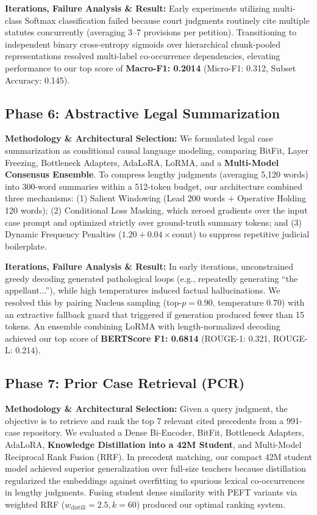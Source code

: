\documentclass[11pt, oneside]{article}
\begin{document}
\medskip
\noindent
\textbf{Iterations, Failure Analysis \& Result:} Early experiments utilizing multi-class Softmax classification failed because court judgments routinely cite multiple statutes concurrently (averaging 3--7 provisions per petition). Transitioning to independent binary cross-entropy sigmoids over hierarchical chunk-pooled representations resolved multi-label co-occurrence dependencies, elevating performance to our top score of \textbf{Macro-F1: 0.2014} (Micro-F1: 0.312, Subset Accuracy: 0.145).

\subsection{Phase 6: Abstractive Legal Summarization}
\noindent
\textbf{Methodology \& Architectural Selection:} We formulated legal case summarization as conditional causal language modeling, comparing BitFit, Layer Freezing, Bottleneck Adapters, AdaLoRA, LoRMA, and a \textbf{Multi-Model Consensus Ensemble}. To compress lengthy judgments (averaging 5,120 words) into 300-word summaries within a 512-token budget, our architecture combined three mechanisms: (1) Salient Windowing (Lead 200 words + Operative Holding 120 words); (2) Conditional Loss Masking, which zeroed gradients over the input case prompt and optimized strictly over ground-truth summary tokens; and (3) Dynamic Frequency Penalties ($1.20 + 0.04 \times \text{count}$) to suppress repetitive judicial boilerplate.

\medskip
\noindent
\textbf{Iterations, Failure Analysis \& Result:} In early iterations, unconstrained greedy decoding generated pathological loops (e.g., repeatedly generating ``the appellant...''), while high temperatures induced factual hallucinations. We resolved this by pairing Nucleus sampling (top-$p=0.90$, temperature $0.70$) with an extractive fallback guard that triggered if generation produced fewer than 15 tokens. An ensemble combining LoRMA with length-normalized decoding achieved our top score of \textbf{BERTScore F1: 0.6814} (ROUGE-1: 0.321, ROUGE-L: 0.214).

\subsection{Phase 7: Prior Case Retrieval (PCR)}
\noindent
\textbf{Methodology \& Architectural Selection:} Given a query judgment, the objective is to retrieve and rank the top 7 relevant cited precedents from a 991-case repository. We evaluated a Dense Bi-Encoder, BitFit, Bottleneck Adapters, AdaLoRA, \textbf{Knowledge Distillation into a 42M Student}, and Multi-Model Reciprocal Rank Fusion (RRF). In precedent matching, our compact 42M student model achieved superior generalization over full-size teachers because distillation regularized the embeddings against overfitting to spurious lexical co-occurrences in lengthy judgments. Fusing student dense similarity with PEFT variants via weighted RRF ($w_{\text{distill}} = 2.5, k=60$) produced our optimal ranking system.
\end{document}
